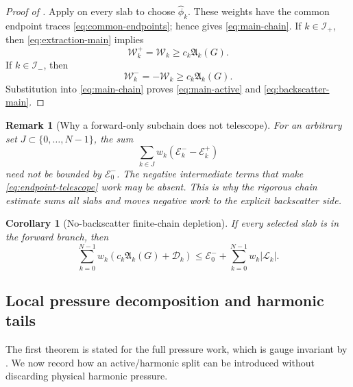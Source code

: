 \documentclass[11pt]{article}
\numberwithin{equation}{section}
\newtheorem{corollary}[theorem]{Corollary}
\newtheorem{remark}[theorem]{Remark}
\newcommand{\W}{\mathcal W}
\newcommand{\D}{\mathcal D}
\newcommand{\Lk}{\mathcal L}
\newcommand{\Ek}{\mathcal E}
\newcommand{\Aact}{\mathfrak A}
\begin{document}
\begin{proof}[Proof of ]
Apply  on every slab to choose \(\widehat\phi_k\). These weights have the common endpoint traces \eqref{eq:common-endpoints}; hence  gives \eqref{eq:main-chain}. If \(k\in\mathcal I_+\), then \eqref{eq:extraction-main} implies
\[
\W_k^+=\W_k\ge c_k\Aact_k(G).
\]
If \(k\in\mathcal I_-\), then
\[
\W_k^-=-\W_k\ge c_k\Aact_k(G).
\]
Substitution into \eqref{eq:main-chain} proves \eqref{eq:main-active} and \eqref{eq:backscatter-main}.
\end{proof}

\begin{remark}[Why a forward-only subchain does not telescope]\label{rem:subset}
For an arbitrary set \(J\subset\{0,\ldots,N-1\}\), the sum
\[
\sum_{k\in J}w_k(\Ek_k^- -\Ek_k^+)
\]
need not be bounded by \(\Ek_0^-\). The negative intermediate terms that make \eqref{eq:endpoint-telescope} work may be absent. This is why the rigorous chain estimate sums all slabs and moves negative work to the explicit backscatter side.
\end{remark}

\begin{corollary}[No-backscatter finite-chain depletion]\label{cor:no-backscatter}
If every selected slab is in the forward branch, then
\begin{equation}\label{eq:no-backscatter}
\sum_{k=0}^{N-1}w_k
\left(
 c_k\Aact_k(G)+\D_k
\right)
\le
\Ek_0^-
+
\sum_{k=0}^{N-1}w_k|\Lk_k|.
\end{equation}
\end{corollary}

\subsection{Local pressure decomposition and harmonic tails}\label{sec:pressure}

The first theorem is stated for the full pressure work, which is gauge invariant by . We now record how an active/harmonic split can be introduced without discarding physical harmonic pressure.
\end{document}
